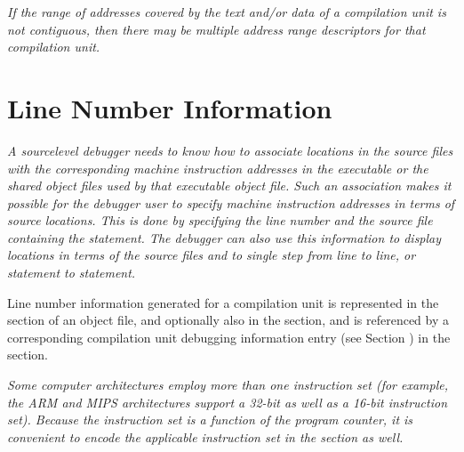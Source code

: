 \textit{If the range of addresses covered by the text and/or data
of a compilation unit is not contiguous, then there may be
multiple address range descriptors for that compilation unit.}


\section{Line Number Information}
\label{chap:linenumberinformation}
\textit{A source\dash level debugger needs to know how to
associate locations in the source files with the corresponding
machine instruction addresses in the executable or the shared 
object files used by that executable object file. Such an
association makes it possible for the debugger user
to specify machine instruction addresses in terms of source
locations. This is done by specifying the line number
and the source file containing the statement. The debugger
can also use this information to display locations in terms
of the source files and to single step from line to line,
or statement to statement.}

Line number information generated for a compilation unit is
represented in the 
\dotdebugline{} section of an object file, and optionally
also in the \dotdebuglinestr{} section, and
is referenced by a corresponding compilation unit debugging
information entry 
(see Section ) 
in the \dotdebuginfo{} section.

\textit{Some computer architectures employ more than one instruction
set (for example, the ARM 
and 
MIPS architectures support
a 32-bit as well as a 16-bit instruction set). Because the
instruction set is a function of the program counter, it is
convenient to encode the applicable instruction set in the
\dotdebugline{} section as well.}

